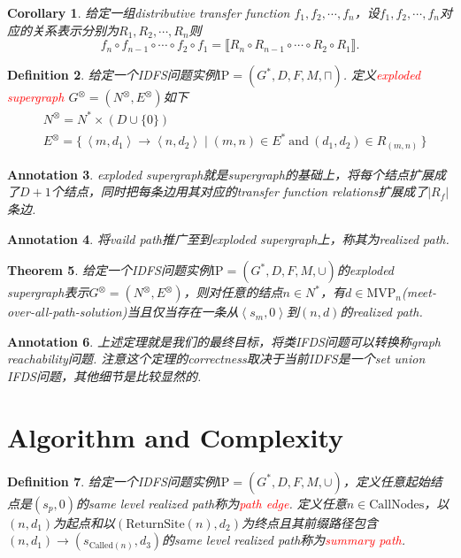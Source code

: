 \documentclass{article}
\newtheorem{theorem}{Theorem}[section]
\newtheorem{corollary}[theorem]{Corollary}
\newtheorem{definition}[theorem]{Definition}
\newtheorem{annotation}[theorem]{Annotation}
\newcommand\Set[2]{\{\,#1\mid#2\,\}} %
\newcommand{\redt}[1]{\textcolor{red}{#1}}
\begin{document}
\begin{corollary}
\rm 给定一组distributive transfer function $f_1,f_2,\cdots,f_n$，设$f_1,f_2,\cdots,f_n$对应的关系表示分别为$R_1,R_2,\cdots,R_n$则
$$
f_n \circ f_{n-1} \circ \cdots \circ f_2 \circ f_1 = \llbracket R_n \circ R_{n-1} \circ \cdots \circ R_2 \circ R_1 \rrbracket.
$$
\end{corollary}

\begin{definition}
\rm 给定一个IDFS问题实例$\text{IP}=(G^*,D,F,M,\sqcap)$. 定义\redt{exploded supergraph} $G^\otimes = (N^\otimes,E^\otimes)$如下
$$
\begin{aligned}
&N^\otimes = N^* \times (D \cup \{0\}) \\
&E^\otimes = \Set{\left<m,d_1\right> \to \left<n,d_2\right>}{(m,n) \in E^*~\text{and}~ (d_1,d_2) \in R_{(m,n)}}
\end{aligned} 
$$
\end{definition}

\begin{annotation}
\rm exploded supergraph就是supergraph的基础上，将每个结点扩展成了$D+1$个结点，同时把每条边用其对应的transfer function relations扩展成了$|R_f|$条边. 
\end{annotation}

\begin{annotation}
\rm 将vaild path推广至到exploded supergraph上，称其为realized path.
\end{annotation}

\begin{theorem}
\rm 给定一个IDFS问题实例$\text{IP}=(G^*,D,F,M,\cup)$的exploded supergraph表示$G^\otimes = (N^\otimes,E^\otimes)$，则对任意的结点$n \in N^*$，有$d \in \text{MVP}_n$(meet-over-all-path-solution)当且仅当存在一条从$\left<s_m, 0\right>$到$(n,d)$的realized path. 
\end{theorem}

\begin{annotation}
\rm 上述定理就是我们的最终目标，将类IFDS问题可以转换称graph reachability问题. 注意这个定理的correctness取决于当前IDFS是一个set union IFDS问题，其他细节是比较显然的. 
\end{annotation}

\newpage
\section{Algorithm and Complexity}


\begin{definition}
\rm 给定一个IDFS问题实例$\text{IP}=(G^*,D,F,M,\cup)$，定义任意起始结点是$(s_p,0)$的same level realized path称为\redt{path edge}. 定义任意$n \in \text{CallNodes}$，以$(n,d_1)$为起点和以$(\text{ReturnSite}(n),d_2)$为终点且其前缀路径包含$(n,d_1) \to (s_{\text{Called}(n)},d_3)$的same level realized path称为\redt{summary path}. 
\end{definition}
\end{document}
